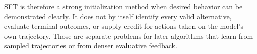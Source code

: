SFT is therefore a strong initialization method when desired behavior can be demonstrated
clearly. It does not by itself identify every valid alternative, evaluate terminal
outcomes, or supply credit for actions taken on the model's own trajectory. Those are
separate problems for later algorithms that learn from sampled trajectories or from
denser evaluative feedback.
